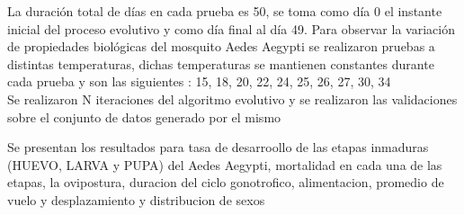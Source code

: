 La duración total de días en cada prueba es 50, se toma como día 0 el instante
inicial del proceso evolutivo y como día final al día 49. Para observar la variación
de propiedades biológicas del mosquito Aedes Aegypti se realizaron pruebas a distintas
temperaturas, dichas temperaturas se mantienen constantes durante cada prueba y son las siguientes :
15\textcelsius , 18\textcelsius , 20\textcelsius , 22\textcelsius ,
24\textcelsius , 25\textcelsius , 26\textcelsius , 27\textcelsius ,
30\textcelsius , 34\textcelsius \\


Se realizaron N iteraciones del algoritmo evolutivo y se realizaron las
validaciones sobre el conjunto de datos generado por el mismo

Se presentan los resultados para tasa de desarroollo de las etapas inmaduras
(HUEVO, LARVA y PUPA) del Aedes Aegypti, mortalidad en cada una de las etapas,
la ovipostura, duracion del ciclo gonotrofico, alimentacion, promedio de vuelo y
desplazamiento y distribucion de sexos


